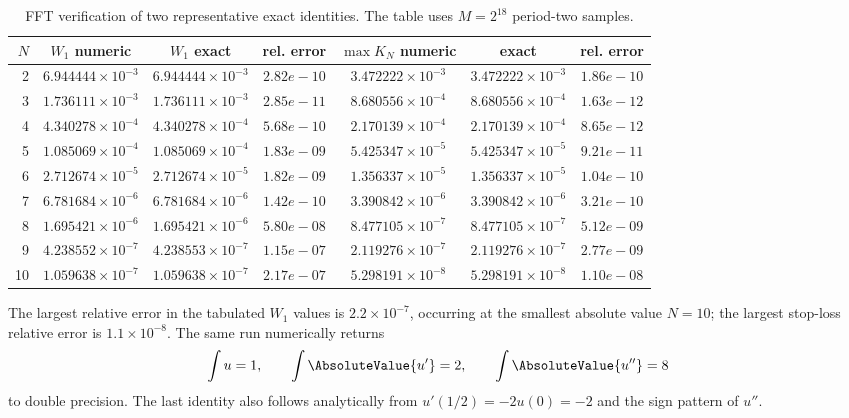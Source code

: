 \documentclass[11pt,oneside]{article}
\numberwithin{equation}{section}
\theoremstyle{definition}
\theoremstyle{remark}
\begin{document}
\begin{table}[htbp]
\centering
\small
\caption{FFT verification of two representative exact identities.  The table uses $M=2^{18}$ period-two samples.}
\label{p5:tab:metric-check}
\setlength{\tabcolsep}{4pt}%
\begin{tabular}{@{}rcccccc@{}}
\toprule
$N$ & $W_1$ numeric & $W_1$ exact & rel. error & $\max K_N$ numeric & exact & rel. error\\
\midrule
2 & $6.944444\times10^{-3}$ & $6.944444\times10^{-3}$ & $2.82e-10$ & $3.472222\times10^{-3}$ & $3.472222\times10^{-3}$ & $1.86e-10$ \\
3 & $1.736111\times10^{-3}$ & $1.736111\times10^{-3}$ & $2.85e-11$ & $8.680556\times10^{-4}$ & $8.680556\times10^{-4}$ & $1.63e-12$ \\
4 & $4.340278\times10^{-4}$ & $4.340278\times10^{-4}$ & $5.68e-10$ & $2.170139\times10^{-4}$ & $2.170139\times10^{-4}$ & $8.65e-12$ \\
5 & $1.085069\times10^{-4}$ & $1.085069\times10^{-4}$ & $1.83e-09$ & $5.425347\times10^{-5}$ & $5.425347\times10^{-5}$ & $9.21e-11$ \\
6 & $2.712674\times10^{-5}$ & $2.712674\times10^{-5}$ & $1.82e-09$ & $1.356337\times10^{-5}$ & $1.356337\times10^{-5}$ & $1.04e-10$ \\
7 & $6.781684\times10^{-6}$ & $6.781684\times10^{-6}$ & $1.42e-10$ & $3.390842\times10^{-6}$ & $3.390842\times10^{-6}$ & $3.21e-10$ \\
8 & $1.695421\times10^{-6}$ & $1.695421\times10^{-6}$ & $5.80e-08$ & $8.477105\times10^{-7}$ & $8.477105\times10^{-7}$ & $5.12e-09$ \\
9 & $4.238552\times10^{-7}$ & $4.238553\times10^{-7}$ & $1.15e-07$ & $2.119276\times10^{-7}$ & $2.119276\times10^{-7}$ & $2.77e-09$ \\
10 & $1.059638\times10^{-7}$ & $1.059638\times10^{-7}$ & $2.17e-07$ & $5.298191\times10^{-8}$ & $5.298191\times10^{-8}$ & $1.10e-08$ \\
\bottomrule
\end{tabular}
\end{table}

The largest relative error in the tabulated $W_1$ values is $2.2\times10^{-7}$, occurring at the smallest absolute value $N=10$; the largest stop-loss relative error is $1.1\times10^{-8}$.  The same run numerically returns
\begin{equation}
 \int u=1,
 \qquad
 \int\AbsoluteValue{u'}=2,
 \qquad
 \int\AbsoluteValue{u''}=8
 \label{p5:eq:diagnostics}
\end{equation}
to double precision.  The last identity also follows analytically from $u'(1/2)=-2u(0)=-2$ and the sign pattern of $u''$.
\end{document}
